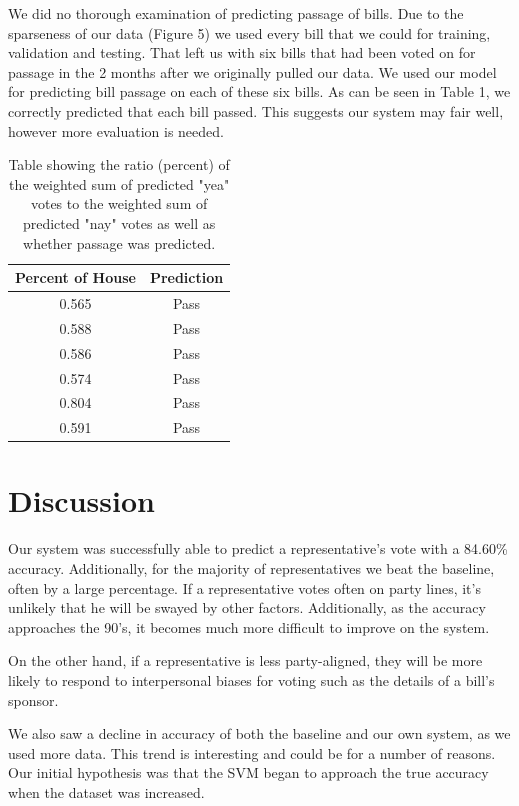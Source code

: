 \documentclass[11pt,letterpaper,twocolumn]{article}
\begin{document}
We did no thorough examination of predicting passage of bills. Due to the sparseness of our data (Figure 5) we used every bill that we could for training, validation and testing. That left us with six bills that had been voted on for passage in the 2 months after we originally pulled our data. We used our model for predicting bill passage on each of these six bills. As can be seen in Table 1, we correctly predicted that each bill passed. This suggests our system may fair well, however more evaluation is needed.

\begin{table}
\centering
\begin{tabular}{|c|c|} \hline
Percent of House & Prediction \\ \hline
0.565 & Pass \\ \hline
0.588 & Pass\\ \hline
0.586 & Pass\\ \hline
0.574 & Pass\\ \hline
0.804 & Pass\\ \hline
0.591 & Pass\\ \hline
\end{tabular}
\caption{Table showing the ratio (percent) of the weighted sum of predicted "yea" votes to the weighted sum of predicted "nay" votes as well as whether passage was predicted.}
\end{table}

\section{Discussion}
Our system was successfully able to predict a representative's vote with a 84.60\% accuracy. Additionally, for the majority of representatives we beat the baseline, often by a large percentage. If a representative votes often on party lines, it's unlikely that he will be swayed by other factors. Additionally, as the accuracy approaches the 90's, it becomes much more difficult to improve on the system. 

On the other hand, if a representative is less party-aligned, they will be more likely to respond to interpersonal biases for voting such as the details of a bill's sponsor. 

We also saw a decline in accuracy of both the baseline and our own system, as we used more data. This trend is interesting and could be for a number of reasons. Our initial hypothesis was that the SVM began to approach the true accuracy when the dataset was increased.
\end{document}
